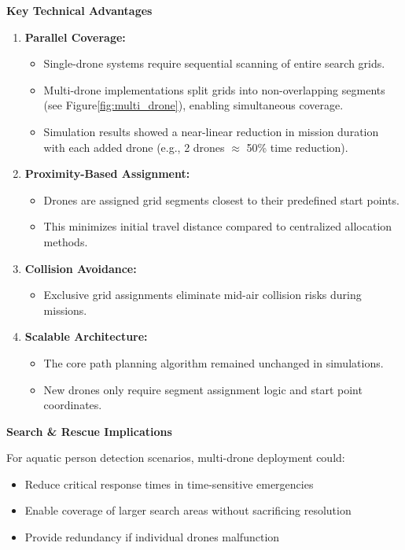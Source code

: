 \textbf{Key Technical Advantages}
\begin{enumerate}
    \item \textbf{Parallel Coverage:}
    \begin{itemize}
        \item Single-drone systems require sequential scanning of entire search grids.
        \item Multi-drone implementations split grids into non-overlapping segments (see Figure\ref{fig:multi_drone}), enabling simultaneous coverage.
        \item Simulation results showed a near-linear reduction in mission duration with each added drone (e.g., 2 drones $\approx$ 50\% time reduction).
    \end{itemize}
    \item \textbf{Proximity-Based Assignment:}
    \begin{itemize}
        \item Drones are assigned grid segments closest to their predefined start points.
        \item This minimizes initial travel distance compared to centralized allocation methods.
    \end{itemize}
    \item \textbf{Collision Avoidance:}
    \begin{itemize}
        \item Exclusive grid assignments eliminate mid-air collision risks during missions.
    \end{itemize}
    \item \textbf{Scalable Architecture:}
    \begin{itemize}
        \item The core path planning algorithm remained unchanged in simulations.
        \item New drones only require segment assignment logic and start point coordinates.
    \end{itemize}
\end{enumerate}

\textbf{Search \& Rescue Implications}

For aquatic person detection scenarios, multi-drone deployment could:
\begin{itemize}
    \item Reduce critical response times in time-sensitive emergencies
    \item Enable coverage of larger search areas without sacrificing resolution
    \item Provide redundancy if individual drones malfunction
\end{itemize}

